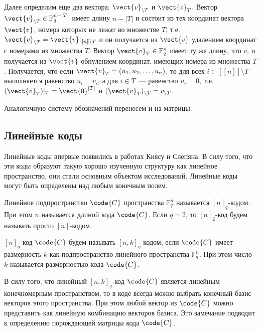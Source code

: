 \documentclass[14pt]{cmcmsuthesis-bachelor}
\begin{document}
Далее определим еще два вектора: \(\vect{v}_{\setminus T}\) и \(\vect{v}_{T}\).
Вектор \(\vect{v}_{\setminus T}\in \mathbb{F}_{q}^{n-|T|}\) имеет длину \(n-|T|\) и состоит из тех координат вектора \(\vect{v}\), номера которых не лежат во множестве \(T\), т.е. \(\vect{v}_{\setminus T}=\vect{v}\vert_{[\![n]\!]\setminus T}\) и он получается из \(\vect{v}\) удалением координат с номерами из множества \(T\).
Вектор \(\vect{v}_{T}\in\mathbb{F}_{q}^{n}\) имеет ту же длину, что \(v\), и получается из \(\vect{v}\) обнулением координат, имеющих номера из множества \(T\).
Получается, что если \(\vect{v}_{T}= \left(u_{1}, u_{2}, \dotsc, u_{n}\right)\), то для всех \(i\in [\![n]\!]\setminus T\) выполняется равенство \(u_{i}=v_{i}\), а для \(i\in T\)~--- равенство \(u_{i}=0\), т.е. \((\vect{v}_{T})\vert_{T}=\vect{0}^{|T|}\) и \((\vect{v}_{T})_{\setminus T}=v_{\setminus T}\).

Аналогичную систему обозначений перенесем и на матрицы.
\subsection{Линейные коды}
\label{sec:orge12e642}
Линейные коды впервые появились в работах Киясу и Слепяна.
В силу того, что эти коды образуют такую хорошо изученную структуру как линейное пространство, они стали основным объектом исследований.
Линейные коды могут быть определены над любым конечным полем.

\begin{definition}\label{def:ncode}
Линейное подпространство \(\code{C}\) пространства \(\mathbb{F}^n_q\) называется \([n]_q\)-кодом.
При этом \(n\) называется длиной кода \(\code{C}\).
Если \(q=2\), то \([n]_2\)-код будем называть просто \([n]\)-кодом.
\end{definition}

\begin{definition}\label{def:nkcode}
\([n]_q\)-код \(\code{C}\) будем называть \([n,k]_q\)-кодом, если \(\code{C}\) имеет размерность \(k\) как подпространство линейного пространства \(\mathbb{F}^n_q\).
При этом число \(k\) называется размерностью кода \(\code{C}\).
\end{definition}

В силу того, что линейный \([n,k]_q\)-код \(\code{C}\) является линейным конечномерным пространством, то в коде всегда можно выбрать конечный базис векторов этого пространства.
При этом любой вектор из \(\code{C}\) можно представить как линейную комбинацию векторов базиса.
Это замечание подводит к определению порождающей матрицы кода \(\code{C}\).
\end{document}

